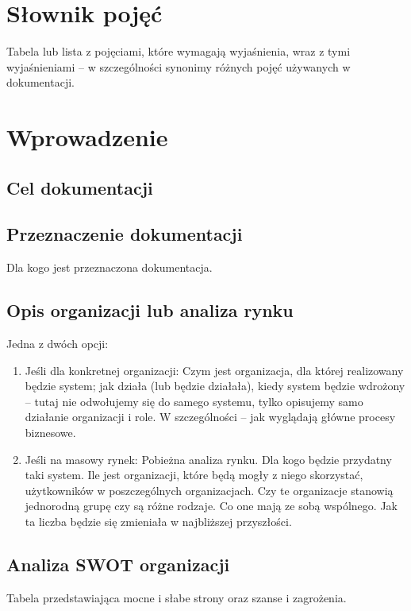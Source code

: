 \documentclass[a4paper,12pt]{article}
\begin{document}
\newpage

\section{Słownik pojęć}
Tabela lub lista z pojęciami, które wymagają wyjaśnienia, wraz z tymi wyjaśnieniami – w szczególności synonimy różnych pojęć używanych w dokumentacji.


\newpage

\section{Wprowadzenie}
\subsection{Cel dokumentacji}


\subsection{Przeznaczenie dokumentacji}
Dla kogo jest przeznaczona dokumentacja.

\subsection{Opis organizacji lub analiza rynku}
Jedna z dwóch opcji:

\begin{enumerate}
    \item Jeśli dla konkretnej organizacji: Czym jest organizacja, dla której realizowany będzie system; jak działa (lub będzie działała), kiedy system będzie wdrożony – tutaj nie odwołujemy się do samego systemu, tylko opisujemy samo działanie organizacji i role. W szczególności – jak wyglądają główne procesy biznesowe.
    \item Jeśli na masowy rynek: Pobieżna analiza rynku. Dla kogo będzie przydatny taki system. Ile jest organizacji, które będą mogły z niego skorzystać, użytkowników w poszczególnych organizacjach. Czy te organizacje stanowią jednorodną grupę czy są różne rodzaje. Co one mają ze sobą wspólnego. Jak ta liczba będzie się zmieniała w najbliższej przyszłości.
\end{enumerate}


\subsection{Analiza SWOT organizacji}
Tabela przedstawiająca mocne i słabe strony oraz szanse i zagrożenia.
\end{document}
